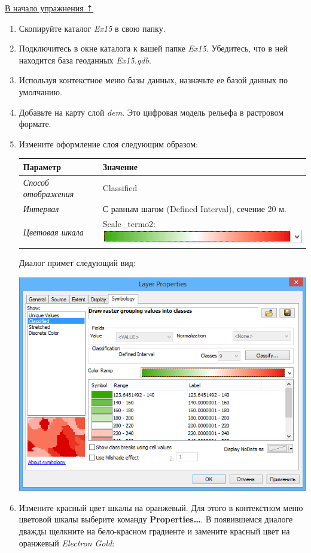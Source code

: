 \documentclass[12pt,]{book}
\begin{document}
\protect\hyperlink{dem}{В начало упражнения ⇡}

\begin{enumerate}
\def\labelenumi{\arabic{enumi}.}
\item
  Скопируйте каталог \emph{Ex15} в свою папку.
\item
  Подключитесь в окне каталога к вашей папке \emph{Ex15}. Убедитесь, что в ней находится база геоданных \emph{Ex15.gdb}.
\item
  Используя контекстное меню базы данных, назначьте ее базой данных по умолчанию.
\item
  Добавьте на карту слой \emph{dem}. Это цифровая модель рельефа в растровом формате.
\item
  Измените оформление слоя следующим образом:

  \begin{longtable}[]{@{}ll@{}}
  \toprule
  Параметр & Значение\tabularnewline
  \midrule
  \endhead
  \emph{Способ отображения} & Classified\tabularnewline
  \emph{Интервал} & С равным шагом (Defined Interval), сечение 20 м.\tabularnewline
  \emph{Цветовая шкала} & Scale\_termo2: \includegraphics{images/Ex15/image7.png}\tabularnewline
  \bottomrule
  \end{longtable}

  Диалог примет следующий вид:

  \includegraphics{images/Ex15/image8.png}
\item
  Измените красный цвет шкалы на оранжевый. Для этого в контекстном меню цветовой шкалы выберите команду \textbf{Properties\ldots{}}. В появившемся диалоге дважды щелкните на бело-красном градиенте и замените красный цвет на оранжевый \emph{Electron Gold}:


\end{enumerate}
\end{document}
